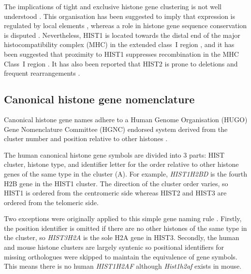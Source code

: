 	The implications of tight and exclusive histone gene clustering is not well understood . 
	This organisation has been suggested to imply that expression is regulated by local elements \citep{close-regulators}, 
	whereas a role in histone gene sequence conservation is disputed . 
	Nevertheless, HIST1 is located towards the distal end of the major histocompatibility complex (MHC) 
	in the extended class~I region \citep{MHC-I-transcript, MHC-complete-sequencing-1999}, 
	and it has been suggested that proximity to HIST1 suppresses recombination in the MHC Class~I region \citep{MHC-repressed-by-HIST}. 
	It has also been reported that HIST2 is prone to deletions and frequent rearrangements \citep{HISTTwo-prone-deletion-discovery, HISTTwo-prone-deletion-focus}. 

  \subsection{Canonical histone gene nomenclature}
    Canonical histone gene names adhere to a Human Genome Organisation (HUGO) Gene Nomenclature Committee (HGNC) 
	endorsed system derived from the cluster number and position relative to other histones \citep{Marzluff02}.

	The human canonical histone gene symbols are divided into 3 parts: 
	HIST cluster, histone type, and identifier letter
	for the order relative to other histone genes of the same type in the cluster (A).
	For example, \textit{HIST1H2BD} is the fourth H2B gene in the HIST1 cluster.
	The direction of the cluster order varies, so HIST1 is ordered from the centromeric side 
	whereas HIST2 and HIST3 are ordered from the telomeric side.
	
    Two exceptions were originally applied to this simple gene naming rule \citep{Marzluff02}. 
	Firstly, the position identifier is omitted if there are no other histones of the same type in the cluster, 
	so \textit{HIST3H2A} is the sole H2A gene in HIST3. 
	Secondly, the human and mouse histone clusters are largely syntenic 
	so positional identifiers for missing orthologues were skipped to maintain the equivalence of gene symbols.
	This means there is no human \textit{HIST1H2AF} although \textit{Hist1h2af} exists in mouse.

